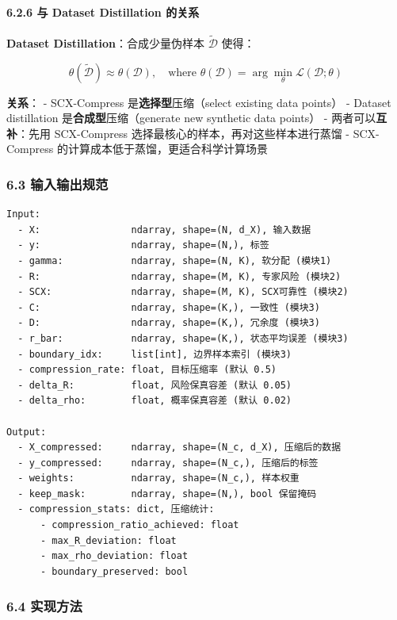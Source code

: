 \documentclass[
  12pt,
]{ctexart}
\begin{document}
\paragraph{6.2.6 与 Dataset Distillation
的关系}\label{ux4e0e-dataset-distillation-ux7684ux5173ux7cfb}

\textbf{Dataset Distillation}：合成少量伪样本 \(\tilde{\mathcal{D}}\)
使得：

\[
\theta(\tilde{\mathcal{D}}) \approx \theta(\mathcal{D}), \quad \text{where } \theta(\mathcal{D}) = \arg\min_\theta \mathcal{L}(\mathcal{D}; \theta)
\]

\textbf{关系}： - SCX-Compress 是\textbf{选择型}压缩（select existing
data points） - Dataset distillation 是\textbf{合成型}压缩（generate new
synthetic data points） - 两者可以\textbf{互补}：先用 SCX-Compress
选择最核心的样本，再对这些样本进行蒸馏 - SCX-Compress
的计算成本低于蒸馏，更适合科学计算场景

\subsubsection{6.3
输入输出规范}\label{ux8f93ux5165ux8f93ux51faux89c4ux8303-5}

\begin{verbatim}
Input:
  - X:                ndarray, shape=(N, d_X), 输入数据
  - y:                ndarray, shape=(N,), 标签
  - gamma:            ndarray, shape=(N, K), 软分配 (模块1)
  - R:                ndarray, shape=(M, K), 专家风险 (模块2)
  - SCX:              ndarray, shape=(M, K), SCX可靠性 (模块2)
  - C:                ndarray, shape=(K,), 一致性 (模块3)
  - D:                ndarray, shape=(K,), 冗余度 (模块3)
  - r_bar:            ndarray, shape=(K,), 状态平均误差 (模块3)
  - boundary_idx:     list[int], 边界样本索引 (模块3)
  - compression_rate: float, 目标压缩率 (默认 0.5)
  - delta_R:          float, 风险保真容差 (默认 0.05)
  - delta_rho:        float, 概率保真容差 (默认 0.02)

Output:
  - X_compressed:     ndarray, shape=(N_c, d_X), 压缩后的数据
  - y_compressed:     ndarray, shape=(N_c,), 压缩后的标签
  - weights:          ndarray, shape=(N_c,), 样本权重
  - keep_mask:        ndarray, shape=(N,), bool 保留掩码
  - compression_stats: dict, 压缩统计:
      - compression_ratio_achieved: float
      - max_R_deviation: float
      - max_rho_deviation: float
      - boundary_preserved: bool
\end{verbatim}

\subsubsection{6.4 实现方法}\label{ux5b9eux73b0ux65b9ux6cd5-5}
\end{document}
